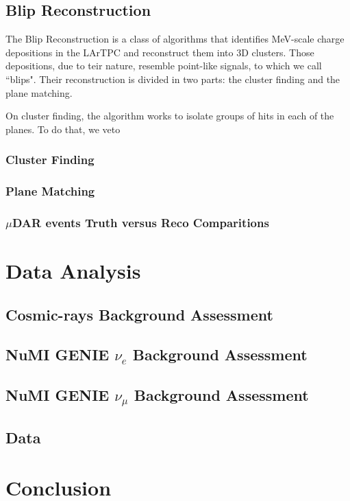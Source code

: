 \subsection{Blip Reconstruction}
The Blip Reconstruction is a class of algorithms that identifies MeV-scale charge depositions in the LArTPC and reconstruct them into 3D clusters. Those depositions, due to teir nature, resemble point-like signals, to which we call ``blips". Their reconstruction is divided in two parts: the cluster finding and the plane matching. 

On cluster finding, the algorithm works to isolate groups of hits in each of the planes. To do that, we veto 
\subsubsection{Cluster Finding}
\subsubsection{Plane Matching}


\subsubsection{$\mu$DAR events Truth versus Reco Comparitions}



\section{Data Analysis}
\subsection{Cosmic-rays Background Assessment}
\subsection{NuMI GENIE $\nu_e$ Background Assessment}
\subsection{NuMI GENIE $\nu_{\mu}$ Background Assessment}
\subsection{Data}
\section{Conclusion}